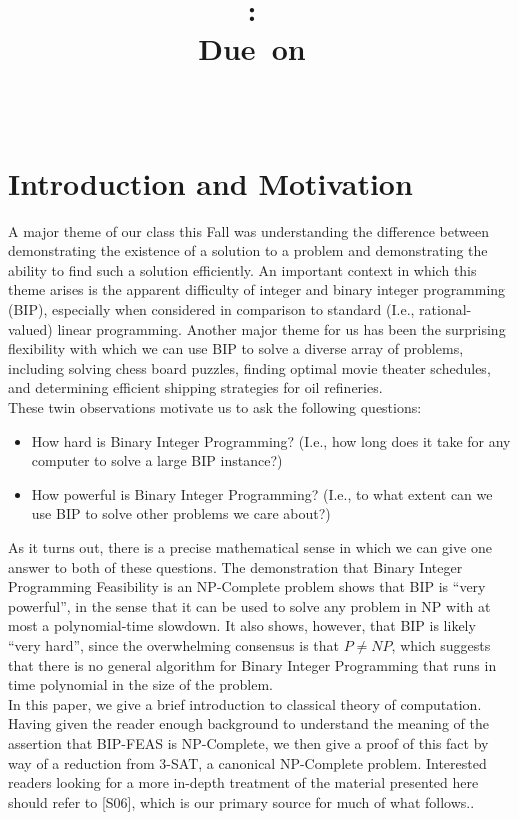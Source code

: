 \documentclass{article}
\title{\vspace{2in}\textmd{\textbf{\hmwkClass:\ \hmwkTitle\ifthenelse{\equal{\hmwkSubTitle}{}}{}{\\\hmwkSubTitle}}}\\\normalsize\vspace{0.1in}\small{Due\ on\ \hmwkDueDate}\\\vspace{0.1in}\large{\textit{\hmwkClassInstructor\ \hmwkClassTime}}\vspace{3in}}
\date{}
\author{\textbf{\hmwkAuthorName}}
\renewcommand{\cite}[1]{[#1]}
\renewcommand{\cite}[1]{[#1]}
\begin{document}
\large

\newpage

\section{Introduction and Motivation}

A major theme of our class this Fall was understanding the difference
between demonstrating the existence of a solution to a problem and
demonstrating the ability to find such a solution efficiently.  An
important context in which this theme arises is the apparent
difficulty of integer and binary integer programming (BIP), especially
when considered in comparison to standard (I.e., rational-valued) linear
programming.  Another major theme for us has been the surprising
flexibility with which we can use BIP to solve a diverse array of
problems, including solving chess board puzzles, finding optimal movie
theater schedules, and determining efficient shipping strategies for
oil refineries. \\

These twin observations motivate us to ask the following questions:

\begin{itemize}
\item How hard is Binary Integer Programming? (I.e., how long does it
  take for any computer to solve a large BIP instance?)
\item How powerful is Binary Integer Programming? (I.e., to what extent
  can we use BIP to solve other problems we care about?)
\end{itemize}

As it turns out, there is a precise mathematical sense in which we can
give one answer to both of these questions.  The demonstration that
Binary Integer Programming Feasibility is an NP-Complete problem shows
that BIP is ``very powerful'', in the sense that it can be used to
solve any problem in NP with at most a polynomial-time slowdown. It
also shows, however, that BIP is likely ``very hard'', since the
overwhelming consensus is that $P \neq NP$, which suggests that there
is no general algorithm for Binary Integer
Programming that runs in time polynomial in the size of the problem. \\

In this paper, we give a brief introduction to classical theory of
computation.  Having given the reader enough background to understand
the meaning of the assertion that BIP-FEAS is NP-Complete, we then
give a proof of this fact by way of a reduction from 3-SAT, a
canonical NP-Complete problem.  Interested readers looking for a more
in-depth treatment of the material presented here should refer to
\cite{S06}, which is our primary source for much of what follows..
\end{document}
